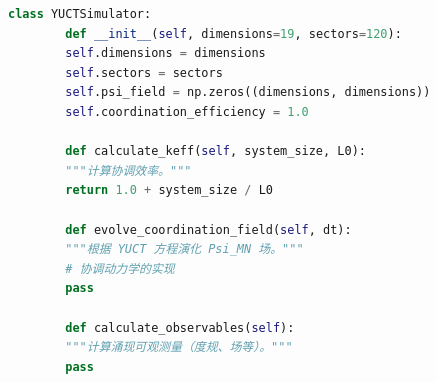 \documentclass[11pt,a4paper]{article}
\theoremstyle{remark}
\begin{document}
	\begin{lstlisting}[language=Python, caption={YUCT 模拟框架}, label={lst:simulation}]
		class YUCTSimulator:
		def __init__(self, dimensions=19, sectors=120):
		self.dimensions = dimensions
		self.sectors = sectors
		self.psi_field = np.zeros((dimensions, dimensions))
		self.coordination_efficiency = 1.0
		
		def calculate_keff(self, system_size, L0):
		"""计算协调效率。"""
		return 1.0 + system_size / L0
		
		def evolve_coordination_field(self, dt):
		"""根据 YUCT 方程演化 Psi_MN 场。"""
		# 协调动力学的实现
		pass
		
		def calculate_observables(self):
		"""计算涌现可观测量（度规、场等）。"""
		pass
	\end{lstlisting}
	
\end{document}
